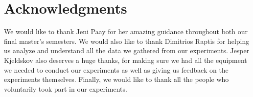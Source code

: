 \section{Acknowledgments}\label{sec:acknowledgment}
We would like to thank Jeni Paay for her amazing guidance throughout both our final master's semesters.
We would also like to thank Dimitrios Raptis for helping us analyze and understand all the data we gathered from our experiments.
Jesper Kjeldskov also deserves a huge thanks, for making sure we had all the equipment we needed to conduct our experiments as well as giving us feedback on the experiments themselves.
Finally, we would like to thank all the people who voluntarily took part in our experiments.   